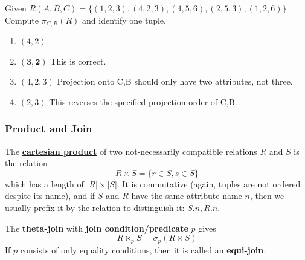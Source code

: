     \begin{example}
      \label{ex:projection-operation}
      Given $R(A,B,C) = \{(1,2,3), (4,2,3), (4,5,6), (2,5,3), (1,2,6)\}$\\
      Compute $\pi_{C,B}(R)$ and identify one tuple.

      \begin{enumerate}
        \item $(4,2)$ 
        \item $\mathbf{(3,2)}$ This is correct. 
        \item $(4,2,3)$ Projection onto C,B should only have two attributes, not three.
        \item $(2,3)$ This reverses the specified projection order of C,B.
      \end{enumerate}
    \end{example}

  \subsubsection{Product and Join}

    \begin{definition}
      \label{def:cartesian-product}
      The \textbf{\hyperref[st-def:cart-prod-2]{cartesian product}} of two not-necessarily compatible relations $R$ and $S$ is the relation 
      \begin{equation}
        R \times S = \{r \in S, s \in S\} 
      \end{equation}
      which has a length of $|R| \times |S|$. It is commutative (again, tuples are not ordered despite its name), and if $S$ and $R$ have the same attribute name $n$, then we usually prefix it by the relation to distinguish it: $S.n, R.n$. 
    \end{definition}

    \begin{definition}
      \label{def:theta-join}
      The \textbf{theta-join} with \textbf{join condition/predicate} $p$ gives 
      \begin{equation}
        R \bowtie_p S = \sigma_p (R \times S)
      \end{equation}
      If $p$ consists of only equality conditions, then it is called an \textbf{equi-join}. 
    \end{definition}

